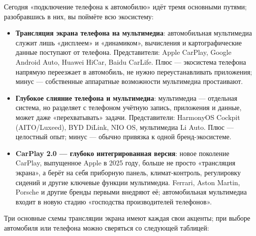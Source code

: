 


Сегодня «подключение телефона к автомобилю» идёт тремя основными путями; разобравшись в них, вы поймёте всю экосистему:

\begin{itemize}
  \item \textbf{Трансляция экрана телефона на мультимедиа}: автомобильная мультимедиа служит лишь «дисплеем» и «динамиком», вычисления и картографические данные поступают от телефона. Представители: Apple CarPlay, Google Android Auto, Huawei HiCar, Baidu CarLife. Плюс — экосистема телефона напрямую переезжает в автомобиль, не нужно переустанавливать приложения; минус — собственные аппаратные возможности мультимедиа простаивают.
  \item \textbf{Глубокое слияние телефона и мультимедиа}: мультимедиа — отдельная система, но разделяет с телефоном учётную запись, приложения и данные, может даже «перехватывать» задачи. Представители: HarmonyOS Cockpit (AITO/Luxeed), BYD DiLink, NIO OS, мультимедиа Li Auto. Плюс — целостный опыт; минус — обычно привязка к одной бренд-экосистеме.
  \item \textbf{CarPlay 2.0 — глубоко интегрированная версия}: новое поколение CarPlay, выпущенное Apple в 2025 году, больше не просто «трансляция экрана», а берёт на себя приборную панель, климат-контроль, регулировку сидений и другие ключевые функции мультимедиа. Ferrari, Aston Martin, Porsche и другие бренды первыми внедряют её; автомобильная мультимедиа входит в новую стадию «господства производителей телефонов».
\end{itemize}


Три основные схемы трансляции экрана имеют каждая свои акценты; при выборе автомобиля или телефона можно сверяться со следующей таблицей:

